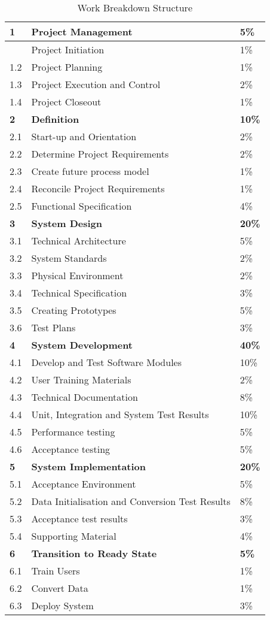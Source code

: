 \begin{table}[h]
\begin{tabular}{|p{1cm}|p{10cm}|p{1cm}|}
\hline
\textbf{1} 	& \textbf{Project Management} & \textbf{5\%} \\ \hline
\indent 1.1	& Project Initiation & 1\% \\
1.2	& Project Planning & 1\% \\
1.3	& Project Execution and Control & 2\% \\
1.4	& Project Closeout & 1\% \\ \hline
\textbf{2}	& \textbf{Definition} & \textbf{10\%} \\ \hline
2.1	& Start-up and Orientation & 2\% \\
2.2	& Determine Project Requirements & 2\% \\
2.3	& Create future process model & 1\% \\
2.4	& Reconcile Project Requirements & 1\% \\
2.5	& Functional Specification & 4\% \\ \hline
\textbf{3}	& \textbf{System Design} & \textbf{20\%} \\ \hline
3.1	& Technical Architecture  & 5\% \\ 
3.2	& System Standards & 2\% \\ 
3.3	& Physical Environment & 2\% \\ 
3.4	& Technical Specification & 3\% \\ 
3.5	& Creating Prototypes & 5\% \\ 
3.6	& Test Plans & 3\% \\ \hline
\textbf{4}	& \textbf{System Development} & \textbf{40\%} \\ \hline
4.1	& Develop and Test Software Modules & 10\% \\ 
4.2	& User Training Materials & 2\% \\ 
4.3	& Technical Documentation & 8\% \\ 
4.4	& Unit, Integration and System Test Results & 10\% \\ 
4.5	& Performance testing & 5\% \\ 
4.6	& Acceptance testing & 5\% \\ \hline
\textbf{5} & \textbf{System Implementation} & \textbf{20\%} \\ \hline
5.1	& Acceptance Environment & 5\% \\ 
5.2	& Data Initialisation and Conversion Test Results & 8\% \\ 
5.3	& Acceptance test results & 3\% \\ 
5.4	& Supporting Material & 4\% \\ \hline
\textbf{6} & \textbf{Transition to Ready State} & \textbf{5\%} \\ \hline
6.1	& Train Users & 1\% \\ 
6.2	& Convert Data & 1\% \\ 
6.3	& Deploy System & 3\% \\ \hline
\end{tabular}
\caption{Work Breakdown Structure}
\label{tag:WBS}
\end{table}


